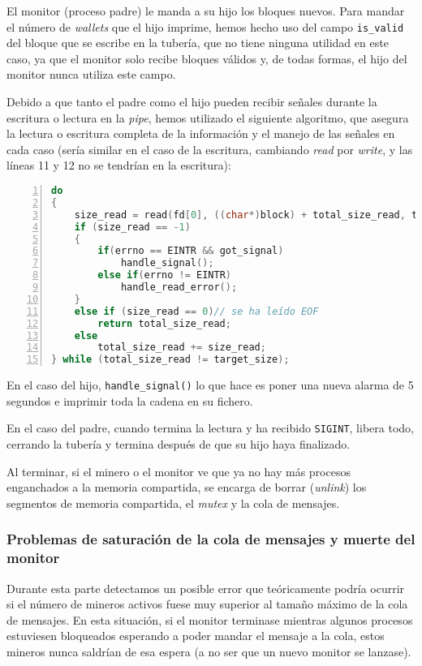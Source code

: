 \documentclass{article}
\begin{document}
    El monitor (proceso padre) le manda a su hijo los bloques nuevos. Para mandar el número de \emph{wallets} que el hijo imprime, hemos hecho uso del campo \texttt{is\_valid} del bloque que se escribe en la tubería, que no tiene ninguna utilidad en este caso, ya que el monitor solo recibe bloques válidos y, de todas formas, el hijo del monitor nunca utiliza este campo.
    
    Debido a que tanto el padre como el hijo pueden recibir señales durante la escritura o lectura en la \textit{pipe}, hemos utilizado el siguiente algoritmo, que asegura la lectura o escritura completa de la información y el manejo de las señales en cada caso (sería similar en el caso de la escritura, cambiando \emph{read} por \emph{write}, y las líneas 11 y 12 no se tendrían en la escritura):

    \begin{lstlisting}[language=C, texcl=true, numbers=left]
do
{
    size_read = read(fd[0], ((char*)block) + total_size_read, target_size - total_size_read);
    if (size_read == -1)
    {
        if(errno == EINTR && got_signal)
            handle_signal();
        else if(errno != EINTR)
            handle_read_error();
    }
    else if (size_read == 0)// se ha leído EOF
        return total_size_read;
    else
        total_size_read += size_read;
} while (total_size_read != target_size);\end{lstlisting}

    En el caso del hijo, \texttt{handle\_signal()} lo que hace es poner una nueva alarma de 5 segundos e imprimir toda la cadena en su fichero.

    En el caso del padre, cuando termina la lectura y ha recibido \texttt{SIGINT}, libera todo, cerrando la tubería y termina después de que su hijo haya finalizado.

    Al terminar, si el minero o el monitor ve que ya no hay más procesos enganchados a la memoria compartida, se encarga de borrar (\emph{unlink}) los segmentos de memoria compartida, el \emph{mutex} y la cola de mensajes.

\subsubsection*{Problemas de saturación de la cola de mensajes y muerte del monitor}

    Durante esta parte detectamos un posible error que teóricamente podría ocurrir si el número de mineros activos fuese muy superior al tamaño máximo de la cola de mensajes. En esta situación, si el monitor terminase mientras algunos procesos estuviesen bloqueados esperando a poder mandar el mensaje a la cola, estos mineros nunca saldrían de esa espera (a no ser que un nuevo monitor se lanzase). 
    
\end{document}
